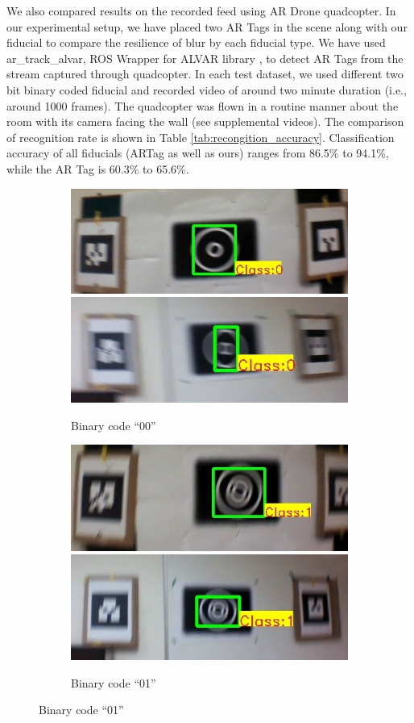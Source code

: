 \documentclass[runningheads]{llncs}
\begin{document}
We also compared results on the recorded feed using AR Drone quadcopter. In our
experimental setup, we have placed two AR Tags in the scene along with our fiducial  to
compare the resilience of blur by each fiducial type. We have used
ar\_track\_alvar, ROS Wrapper for ALVAR library \cite{ros_alvar}, to detect AR
Tags from the stream captured through quadcopter. In each test dataset, we used
different two bit binary coded fiducial and recorded video of around two minute
duration (i.e., around 1000 frames).   The quadcopter was flown in a routine
manner about the room with its camera facing the wall (see supplemental
videos). The comparison of recognition rate is shown in Table
\ref{tab:recongition_accuracy}. Classification accuracy of all fiducials (ARTag
as well as ours) ranges from 86.5\% to 94.1\%, while the AR Tag is 60.3\% to 65.6\%.
\begin{figure}
\begin{subfigure}{\textwidth}
\centering
  \includegraphics[width=0.48\linewidth]{output_00.jpg}
  \includegraphics[width=0.48\linewidth]{new_results/output_00.jpg}
  \caption{Binary code ``00''}
  \label{fig:output0}
\end{subfigure}
\begin{subfigure}{\textwidth}
\centering
  \includegraphics[width=0.48\linewidth]{output_01.jpg}
  \includegraphics[width=0.48\linewidth]{new_results/output_01.jpg}
  \caption{Binary code ``01''}

\end{subfigure}
\end{figure}
\end{document}
